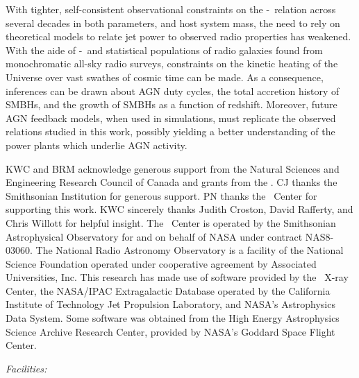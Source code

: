 \documentclass{emulateapj}
\begin{document}
With tighter, self-consistent observational constraints on the
\pjet-\prad\ relation across several decades in both parameters, and
host system mass, the need to rely on theoretical models to relate jet
power to observed radio properties has weakened. With the aide of
\pjet-\prad\ and statistical populations of radio galaxies found from
monochromatic all-sky radio surveys, constraints on the kinetic
heating of the Universe over vast swathes of cosmic time can be made.
As a consequence, inferences can be drawn about AGN duty cycles, the
total accretion history of SMBHs, and the growth of SMBHs as a
function of redshift. Moreover, future AGN feedback models, when used
in simulations, must replicate the observed relations studied in this
work, possibly yielding a better understanding of the power plants
which underlie AGN activity.

\acknowledgements

KWC and BRM acknowledge generous support from the Natural Sciences and
Engineering Research Council of Canada and grants from the \cxo. CJ
thanks the Smithsonian Institution for generous support. PN thanks the
\cxo\ Center for supporting this work. KWC sincerely thanks Judith
Croston, David Rafferty, and Chris Willott for helpful insight. The
\cxo\ Center is operated by the Smithsonian Astrophysical Observatory
for and on behalf of NASA under contract NAS8-03060. The National
Radio Astronomy Observatory is a facility of the National Science
Foundation operated under cooperative agreement by Associated
Universities, Inc. This research has made use of software provided by
the \chandra\ X-ray Center, the NASA/IPAC Extragalactic Database
operated by the California Institute of Technology Jet Propulsion
Laboratory, and NASA's Astrophysics Data System. Some software was
obtained from the High Energy Astrophysics Science Archive Research
Center, provided by NASA's Goddard Space Flight Center.


{\it Facilities:}  





\clearpage



\end{document}
